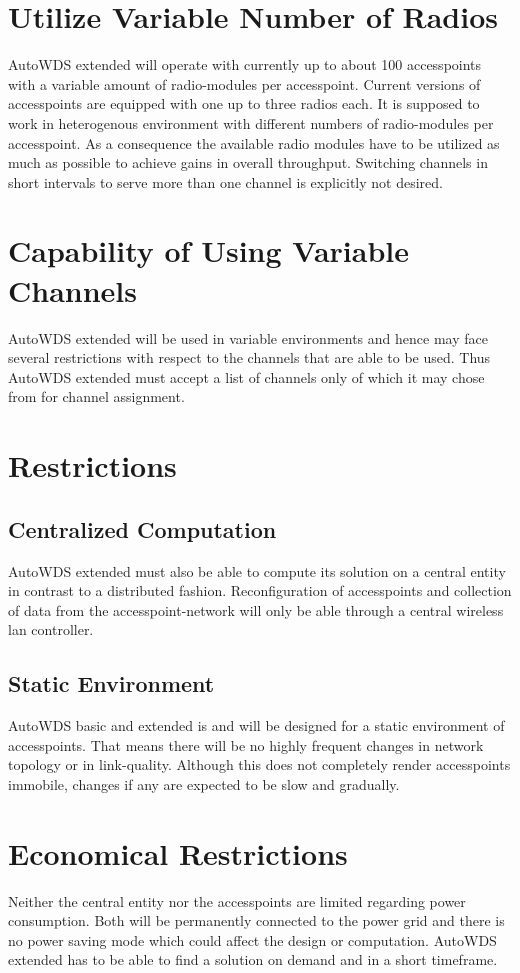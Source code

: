   \section{Utilize Variable Number of Radios}
  AutoWDS extended will operate with currently up to about 100 accesspoints with a variable amount of radio-modules per accesspoint.
  Current versions of accesspoints are equipped with one up to three radios each. It is supposed to work in heterogenous environment with 
  different numbers of radio-modules per accesspoint. As a consequence the available radio modules 
  have to be utilized as much as possible to achieve gains in overall throughput.
  Switching channels in short intervals to serve more than one channel is explicitly not desired.
  \section{Capability of Using Variable Channels}
  AutoWDS extended will be used in variable environments and hence may face several restrictions with respect to the channels that are able to be used.
  Thus AutoWDS extended must accept a list of channels only of which it may chose from for channel assignment.
  \section{Restrictions}
  \subsection{Centralized Computation}
    AutoWDS extended must also be able to compute its solution on a central entity in contrast to a distributed fashion.
    Reconfiguration of accesspoints and collection of data from the accesspoint-network will only be able through a central wireless lan controller.
  \subsection{Static Environment}
    AutoWDS basic and extended is and will be designed for a static environment of accesspoints. That means there will be no highly frequent changes in
    network topology or in link-quality. Although this does not completely render accesspoints immobile, changes if any are expected to be slow and gradually.
\section{Economical Restrictions}
  Neither the central entity nor the accesspoints are limited regarding power consumption. Both will be permanently connected to the power grid and there is no power saving mode
  which could affect the design or computation.
  AutoWDS extended has to be able to find a solution on demand and in a short timeframe.